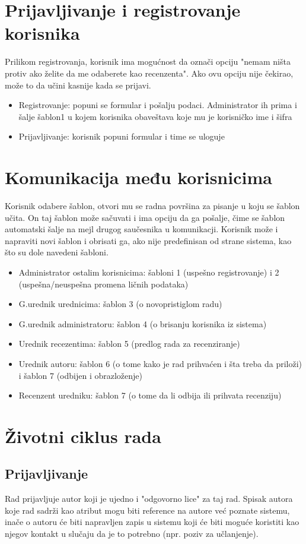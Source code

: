 \documentclass[a4paper,14,4pt]{article}
\begin{document}
\section{Prijavljivanje i registrovanje korisnika}
Prilikom registrovanja, korisnik ima mogućnost da označi opciju "nemam ništa protiv ako želite da me odaberete kao recenzenta". Ako ovu opciju nije čekirao, može to da učini kasnije kada se prijavi.
\begin{itemize}
    \item Registrovanje: popuni se formular i pošalju podaci. Administrator ih prima i šalje šablon1 u kojem korisnika obaveštava koje mu je korisničko ime i šifra
    \item Prijavljivanje: korisnik popuni formular i time se uloguje
\end{itemize}

\section{Komunikacija među korisnicima}
Korisnik odabere šablon, otvori mu se radna površina za pisanje u koju se šablon učita. On taj šablon može sačuvati i ima opciju da ga pošalje, čime se šablon automatski šalje na mejl drugog saučesnika u komunikacji. Korisnik može i napraviti novi šablon i obrisati ga, ako nije predefinisan od strane sistema, kao što su dole navedeni šabloni.
\begin{itemize}
\item Administrator ostalim korisnicima: šabloni 1 (uspešno registrovanje) i 2 (uspešna/neuspešna promena ličnih podataka)
\item G.urednik urednicima: šablon 3 (o novopristiglom radu)
\item G.urednik administratoru: šablon 4 (o brisanju korisnika iz sistema)
\item Urednik recezentima: šablon 5 (predlog rada za recenziranje)
\item Urednik autoru: šablon 6 (o tome kako je rad prihvaćen i šta treba da priloži) i  šablon 7 (odbijen i obrazloženje)
\item Recenzent uredniku: šablon 7 (o tome da li odbija ili prihvata recenziju)
\end{itemize}

\section{Životni ciklus rada}
\subsection{Prijavljivanje}
Rad prijavljuje autor koji je ujedno i "odgovorno lice" za taj rad. Spisak autora koje rad sadrži kao atribut mogu biti reference na autore već poznate sistemu, inače o autoru će biti napravljen zapis u sistemu koji će biti moguće koristiti kao njegov kontakt u slučaju da je to potrebno (npr. poziv za učlanjenje).
\end{document}
